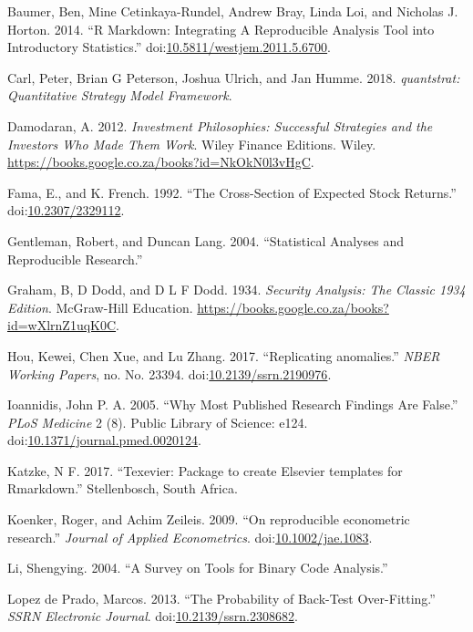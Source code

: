 \documentclass[11pt,preprint, authoryear]{elsarticle}
\numberwithin{equation}{section}
\numberwithin{figure}{section}
\numberwithin{table}{section}
\begin{document}
\hypertarget{ref-Baumer2014}{}
Baumer, Ben, Mine Cetinkaya-Rundel, Andrew Bray, Linda Loi, and Nicholas
J. Horton. 2014. ``R Markdown: Integrating A Reproducible Analysis Tool
into Introductory Statistics.''
doi:\href{https://doi.org/10.5811/westjem.2011.5.6700}{10.5811/westjem.2011.5.6700}.

\hypertarget{ref-Carl2018}{}
Carl, Peter, Brian G Peterson, Joshua Ulrich, and Jan Humme. 2018.
\emph{quantstrat: Quantitative Strategy Model Framework}.

\hypertarget{ref-Damodaran2012}{}
Damodaran, A. 2012. \emph{Investment Philosophies: Successful Strategies
and the Investors Who Made Them Work}. Wiley Finance Editions. Wiley.
\url{https://books.google.co.za/books?id=NkOkN0l3vHgC}.

\hypertarget{ref-Fama1992}{}
Fama, E., and K. French. 1992. ``The Cross-Section of Expected Stock
Returns.'' doi:\href{https://doi.org/10.2307/2329112}{10.2307/2329112}.

\hypertarget{ref-Gentleman2004}{}
Gentleman, Robert, and Duncan Lang. 2004. ``Statistical Analyses and
Reproducible Research.''

\hypertarget{ref-Graham1934a}{}
Graham, B, D Dodd, and D L F Dodd. 1934. \emph{Security Analysis: The
Classic 1934 Edition}. McGraw-Hill Education.
\url{https://books.google.co.za/books?id=wXlrnZ1uqK0C}.

\hypertarget{ref-Hou2017}{}
Hou, Kewei, Chen Xue, and Lu Zhang. 2017. ``Replicating anomalies.''
\emph{NBER Working Papers}, no. No. 23394.
doi:\href{https://doi.org/10.2139/ssrn.2190976}{10.2139/ssrn.2190976}.

\hypertarget{ref-Ioannidis2005}{}
Ioannidis, John P. A. 2005. ``Why Most Published Research Findings Are
False.'' \emph{PLoS Medicine} 2 (8). Public Library of Science: e124.
doi:\href{https://doi.org/10.1371/journal.pmed.0020124}{10.1371/journal.pmed.0020124}.

\hypertarget{ref-Katzke2017}{}
Katzke, N F. 2017. ``Texevier: Package to create Elsevier templates for
Rmarkdown.'' Stellenbosch, South Africa.

\hypertarget{ref-Koenker2009}{}
Koenker, Roger, and Achim Zeileis. 2009. ``On reproducible econometric
research.'' \emph{Journal of Applied Econometrics}.
doi:\href{https://doi.org/10.1002/jae.1083}{10.1002/jae.1083}.

\hypertarget{ref-Li2004}{}
Li, Shengying. 2004. ``A Survey on Tools for Binary Code Analysis.''

\hypertarget{ref-LopezdePrado2013}{}
Lopez de Prado, Marcos. 2013. ``The Probability of Back-Test
Over-Fitting.'' \emph{SSRN Electronic Journal}.
doi:\href{https://doi.org/10.2139/ssrn.2308682}{10.2139/ssrn.2308682}.
\end{document}
